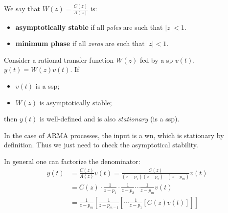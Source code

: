 \begin{definition}
	We say that $W(z)=\frac{C(z)}{A(z)}$ is:
	\begin{itemize}
		\item \textbf{asymptotically stable} if all \emph{poles} are such that $|z|<1$.
		\item \textbf{minimum phase} if all \emph{zeros} are such that $|z|<1$.
	\end{itemize}
\end{definition}

\begin{theorem}
	Consider a rational transfer function $W(z)$ fed by a \gls{sp} $v(t)$, $y(t)=W(z)v(t)$. If
	\begin{itemize}
		\item $v(t)$ is a \gls{ssp};
		\item $W(z)$ is asymptotically stable;
	\end{itemize}
	then $y(t)$ is well-defined and is also \emph{stationary} (is a \gls{ssp}).
\end{theorem}

In the case of ARMA processes, the input is a \gls{wn}, which is stationary by definition. Thus we just need to check the asymptotical stability.

In general one can factorize the denominator:
\begin{align*}
	y(t)&=\frac{C(z)}{A(z)}v(t)=\frac{C(z)}{(z-p_{1})(z-p_{2})\cdots(z-p_{m})}v(t)\\
	&=C(z)\cdot\frac{1}{z-p_{1}}\cdot\frac{1}{z-p_{2}}\cdots\frac{1}{z-p_{m}}v(t)\\
	&=\frac{1}{z-p_{m}}\left[ \frac{1}{z-p_{m-1}}\left[ \cdots\frac{1}{z-p_{1}}\left[ C(z)v(t) \right]   \right]   \right]  
\end{align*}
\begin{figure}[htpb]
	\centering
\end{figure}
\FloatBarrier